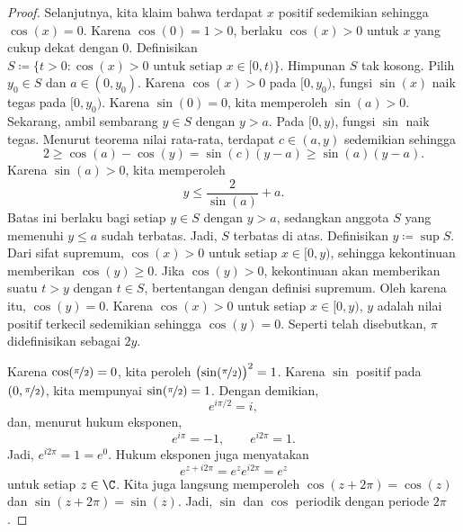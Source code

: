\begin{proof}
Selanjutnya, kita klaim bahwa terdapat $x$ positif sedemikian sehingga $\cos(x) = 0$.
Karena $\cos(0) = 1 > 0$, berlaku $\cos(x) > 0$
untuk $x$ yang cukup dekat dengan $0$. Definisikan
$S \coloneqq \{ t > 0 : \cos(x) > 0 \text{ untuk setiap } x \in [0,t) \}$.
Himpunan $S$ tak kosong. Pilih $y_0 \in S$ dan $a \in (0,y_0)$.
Karena $\cos(x) > 0$ pada $[0,y_0)$, fungsi $\sin(x)$ naik tegas
pada $[0,y_0)$. Karena $\sin(0) = 0$, kita memperoleh $\sin(a) > 0$.
Sekarang, ambil sembarang $y \in S$ dengan $y > a$. Pada $[0,y)$,
fungsi $\sin$ naik tegas. Menurut teorema nilai rata-rata,
terdapat $c \in (a,y)$ sedemikian sehingga
\begin{equation*}
2 \geq \cos(a)-\cos(y) = \sin(c)(y-a) \geq \sin(a)(y-a) .
\end{equation*}
Karena $\sin(a) > 0$, kita memperoleh
\begin{equation*}
y \leq \frac{2}{\sin(a)} + a .
\end{equation*}
Batas ini berlaku bagi setiap $y \in S$ dengan $y > a$, sedangkan anggota $S$
yang memenuhi $y \leq a$ sudah terbatas. Jadi, $S$ terbatas di atas. Definisikan
$y \coloneqq \sup S$. Dari sifat supremum, $\cos(x) > 0$ untuk setiap $x \in [0,y)$,
sehingga kekontinuan memberikan $\cos(y) \geq 0$. Jika $\cos(y) > 0$, kekontinuan
akan memberikan suatu $t > y$ dengan $t \in S$, bertentangan dengan definisi supremum.
Oleh karena itu, $\cos(y) = 0$. Karena $\cos(x) > 0$ untuk setiap $x \in [0,y)$,
$y$ adalah nilai positif terkecil sedemikian sehingga $\cos(y) = 0$. Seperti telah disebutkan,
$\pi$ didefinisikan sebagai $2y$.

Karena $\cos(\nicefrac{\pi}{2}) = 0$, kita peroleh
${\bigl(\sin(\nicefrac{\pi}{2})\bigr)}^2 = 1$.
Karena $\sin$ positif pada $(0,\nicefrac{\pi}{2})$, kita mempunyai
$\sin(\nicefrac{\pi}{2}) = 1$.
Dengan demikian,
\begin{equation*}
e^{i \pi /2} = i ,
\end{equation*}
dan, menurut hukum eksponen,
\begin{equation*}
e^{i \pi} = -1 ,
\qquad 
e^{i 2\pi} = 1 .
\end{equation*}
Jadi, $e^{i2\pi} = 1 = e^0$. Hukum eksponen juga menyatakan
\begin{equation*}
e^{z+i2\pi} = e^z e^{i2\pi} = e^z
\end{equation*}
untuk setiap $z \in \C$. Kita juga langsung memperoleh
$\cos(z+2\pi) = \cos(z)$ dan $\sin(z+2\pi) = \sin(z)$.
Jadi, $\sin$ dan $\cos$ periodik dengan periode $2\pi$.


\end{proof}
